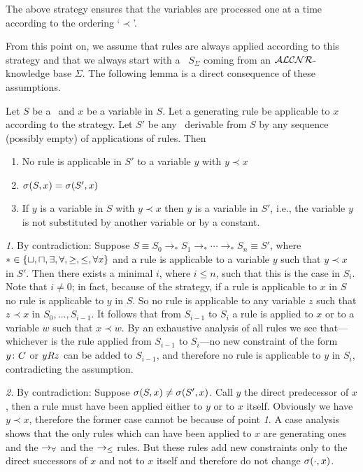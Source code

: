 The above strategy ensures that the variables are processed one at a time 
according to the ordering `$\prec$'. 


From this point on, we assume that rules are always applied according to this
strategy and that we always start with a \cs\ $S_\Sigma$ coming 
from an ${\cal ALCNR}$-knowledge base $\Sigma$. The following lemma is a 
direct consequence of these assumptions.

\begin{lemma}[Stability] \label{stability}
  Let $S$ be a \cs\ and $x$ be a variable in $S$.
  Let a generating rule be applicable to $x$ according to the strategy.
  Let $S'$ be any \cs\ derivable from $S$ by any sequence (possibly empty)
  of applications of rules.
  Then
  \begin{enumerate}
    \item No rule is applicable in $S'$ to a variable $y$ with $y\prec x$
    \item $\sigma(S,x) = \sigma(S',x)$
    \item If $y$ is a variable in $S$ with $y \prec x$ then $y$ is a variable
              in $S'$, i.e., the variable $y$ is not substituted by another variable
              or by a constant.
  \end{enumerate}
\end{lemma}
%
\proof
%
{\it 1.}
By contradiction: Suppose $S \equiv S_0 \to_\ast S_1 \to_\ast
\cdots \to_\ast S_n \equiv S'$, where $\ast \in
\{\sqcup,\sqcap,\exists,\forall,\geq,\leq,\forall x \}$
 and a rule is applicable to a variable $y$ such that $y\prec x$ in $S'$.
Then there exists a minimal $i$, where $i \leq n$,  such that this is the case in
$S_i$. Note that $i \neq 0$; in fact, because of the strategy, if a
rule is applicable to $x$ in $S$ no rule is applicable to $y$ in $S$.
So no rule is applicable to any variable $z$ such that $z\prec x$ in
$S_0,\ldots,S_{i-1}$. It follows that from $S_{i-1}$ to $S_i$ a rule
is applied to $x$ or to a variable $w$ such that $x\prec w$. 
By an exhaustive analysis of all rules we see
that---whichever is the rule applied from $S_{i-1}$ to $S_i$---no new
constraint of the form $y\colon C$ or $yRz$ can be added to
$S_{i-1}$, and therefore no rule is applicable to $y$ in $S_i$, 
contradicting the assumption.

\noindent
{\it 2.} By contradiction: Suppose $\sigma(S,x) \neq \sigma(S',x)$. Call $y$ the
direct predecessor of $x$, then a rule must have been applied either to $y$ or
to $x$ itself. Obviously we have $y\prec x$, therefore the former case cannot
be because of point {\it 1}. A case analysis shows that the only rules which can
have been applied to $x$ are generating ones and the $\rightarrow_\forall$ and the
$\rightarrow_\leq$ rules.  But these rules add new constraints only to the direct
successors of $x$ and not to $x$ itself and therefore do not change $\sigma(\cdot,x)$. %

